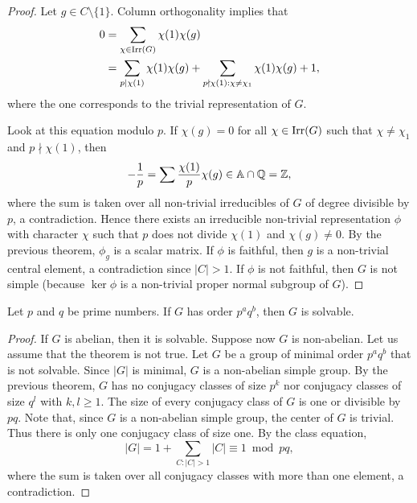 \begin{proof}
	Let $g\in C\setminus\{1\}$. Column orthogonality implies that 
	\begin{equation}
	\label{eq:Burnside}
	\begin{aligned}
		0&=\sum_{\chi\in\operatorname{Irr}(G)}\chi(1)\chi(g)\\
		&=\sum_{p\mid\chi(1)}\chi(1)\chi(g)+\sum_{p\nmid\chi(1):\chi\ne\chi_1}\chi(1)\chi(g)+1,
	\end{aligned}
	\end{equation}
	where the one corresponds to the trivial representation of
	$G$.
	
	Look at this equation modulo $p$. If $\chi(g)=0$ for all
	$\chi\in\operatorname{Irr}(G)$
	such that $\chi\ne\chi_1$ and $p\nmid\chi(1)$, then
	\[
	-\frac{1}{p}=\sum\frac{\chi(1)}{p}\chi(g)\in\mathbb{A}\cap\mathbb{Q}=\mathbb{Z},
	\]
	where the sum is taken over all non-trivial irreducibles
	of $G$ of degree divisible by $p$, a contradiction. Hence 
	there exists an irreducible non-trivial representation 
	$\phi$ with character $\chi$ such that $p$ does not divide
	$\chi(1)$ and $\chi(g)\ne0$. By the previous theorem, 
	$\phi_g$ is a scalar matrix. If $\phi$ is faithful, then 
	$g$ is a non-trivial central element, a contradiction since 
    $|C|>1$. If $\phi$ is not faithful, then 
    $G$ is not simple (because 
	$\ker\phi$ is a non-trivial proper normal subgroup of $G$). 
\end{proof}

\begin{theorem}[Burnside]
  \label{thm:pq}
  Let $p$ and $q$ be prime numbers. If $G$ has order $p^aq^b$, then $G$ is solvable.
\end{theorem}

\begin{proof}
	If $G$ is abelian, then it is solvable.
	Suppose now $G$ is non-abelian.
	Let us assume that the theorem is not true. Let $G$ be a group
	of minimal order $p^aq^b$
	that is not solvable. Since $|G|$ is minimal, $G$ is a non-abelian simple group.
	By the previous theorem, 
	$G$ has no conjugacy classes of size $p^k$ nor 
	conjugacy classes of size $q^l$ with $k,l\geq1$. The size
	of every conjugacy class of $G$ is one or divisible by $pq$. 
	Note that, since $G$ is a non-abelian simple group,
	the center of $G$ is trivial.
	Thus there is only one conjugacy class of size one.
	By the class
	equation,
	\[
		|G|=1+\sum_{C:|C|>1}|C|\equiv 1 \bmod pq,
	\]
	where the sum is taken over all conjugacy classes 
	with more than one element, a contradiction.
\end{proof}

